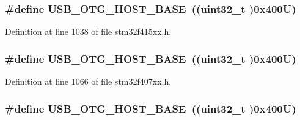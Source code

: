 \subsubsection[{\texorpdfstring{U\+S\+B\+\_\+\+O\+T\+G\+\_\+\+H\+O\+S\+T\+\_\+\+B\+A\+SE}{USB_OTG_HOST_BASE}}]{\setlength{\rightskip}{0pt plus 5cm}\#define U\+S\+B\+\_\+\+O\+T\+G\+\_\+\+H\+O\+S\+T\+\_\+\+B\+A\+SE~((uint32\+\_\+t )0x400\+U)}\hypertarget{group___peripheral__registers__structures_ga3bb2dd6c82eefd8587b6146ba36ae071}{}\label{group___peripheral__registers__structures_ga3bb2dd6c82eefd8587b6146ba36ae071}


Definition at line 1038 of file stm32f415xx.\+h.

\subsubsection[{\texorpdfstring{U\+S\+B\+\_\+\+O\+T\+G\+\_\+\+H\+O\+S\+T\+\_\+\+B\+A\+SE}{USB_OTG_HOST_BASE}}]{\setlength{\rightskip}{0pt plus 5cm}\#define U\+S\+B\+\_\+\+O\+T\+G\+\_\+\+H\+O\+S\+T\+\_\+\+B\+A\+SE~((uint32\+\_\+t )0x400\+U)}\hypertarget{group___peripheral__registers__structures_ga3bb2dd6c82eefd8587b6146ba36ae071}{}\label{group___peripheral__registers__structures_ga3bb2dd6c82eefd8587b6146ba36ae071}


Definition at line 1066 of file stm32f407xx.\+h.

\subsubsection[{\texorpdfstring{U\+S\+B\+\_\+\+O\+T\+G\+\_\+\+H\+O\+S\+T\+\_\+\+B\+A\+SE}{USB_OTG_HOST_BASE}}]{\setlength{\rightskip}{0pt plus 5cm}\#define U\+S\+B\+\_\+\+O\+T\+G\+\_\+\+H\+O\+S\+T\+\_\+\+B\+A\+SE~((uint32\+\_\+t )0x400\+U)}\hypertarget{group___peripheral__registers__structures_ga3bb2dd6c82eefd8587b6146ba36ae071}{}\label{group___peripheral__registers__structures_ga3bb2dd6c82eefd8587b6146ba36ae071}


